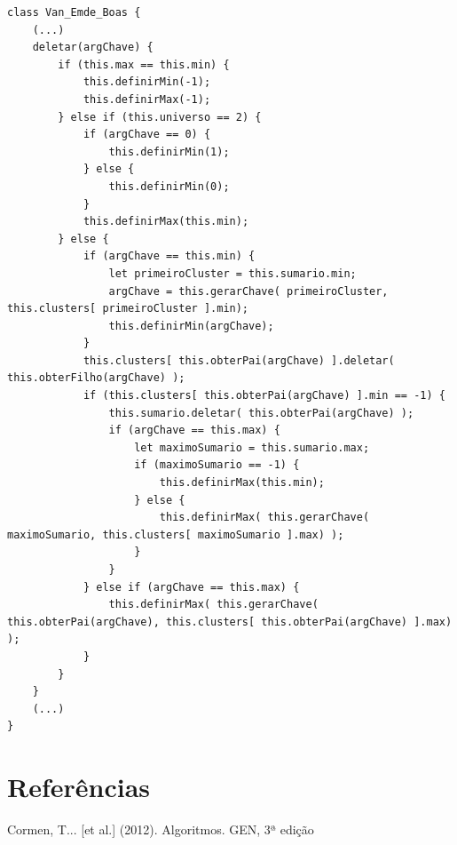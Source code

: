 \documentclass[12pt]{article}
\begin{document}
\begin{verbatim}
class Van_Emde_Boas {
    (...)
    deletar(argChave) {
        if (this.max == this.min) {
            this.definirMin(-1);
            this.definirMax(-1);
        } else if (this.universo == 2) {
            if (argChave == 0) {
                this.definirMin(1);
            } else {
                this.definirMin(0);
            }
            this.definirMax(this.min);
        } else {
            if (argChave == this.min) {
                let primeiroCluster = this.sumario.min;
                argChave = this.gerarChave( primeiroCluster, this.clusters[ primeiroCluster ].min);
                this.definirMin(argChave);
            }
            this.clusters[ this.obterPai(argChave) ].deletar( this.obterFilho(argChave) );
            if (this.clusters[ this.obterPai(argChave) ].min == -1) {
                this.sumario.deletar( this.obterPai(argChave) );
                if (argChave == this.max) {
                    let maximoSumario = this.sumario.max;
                    if (maximoSumario == -1) {
                        this.definirMax(this.min);
                    } else {
                        this.definirMax( this.gerarChave( maximoSumario, this.clusters[ maximoSumario ].max) );
                    }
                }
            } else if (argChave == this.max) {
                this.definirMax( this.gerarChave( this.obterPai(argChave), this.clusters[ this.obterPai(argChave) ].max) );
            }
        }
    }
    (...)
}
\end{verbatim}

\section{Referências}

Cormen, T... [et al.] (2012). Algoritmos. GEN, 3ª edição
\end{document}
